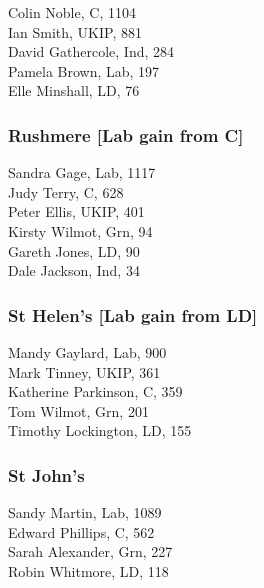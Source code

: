 \documentclass[a4paper,openany,10pt]{book}
\begin{document}


Colin Noble, C, 1104\\
Ian Smith, UKIP, 881\\
David Gathercole, Ind, 284\\
Pamela Brown, Lab, 197\\
Elle Minshall, LD, 76\\


\subsubsection*{Rushmere \hspace*{\fill}\nolinebreak[1]%
\enspace\hspace*{\fill}
[Lab gain from C]}



Sandra Gage, Lab, 1117\\
Judy Terry, C, 628\\
Peter Ellis, UKIP, 401\\
Kirsty Wilmot, Grn, 94\\
Gareth Jones, LD, 90\\
Dale Jackson, Ind, 34\\


\subsubsection*{St Helen's \hspace*{\fill}\nolinebreak[1]%
\enspace\hspace*{\fill}
[Lab gain from LD]}



Mandy Gaylard, Lab, 900\\
Mark Tinney, UKIP, 361\\
Katherine Parkinson, C, 359\\
Tom Wilmot, Grn, 201\\
Timothy Lockington, LD, 155\\


\subsubsection*{St John's}



Sandy Martin, Lab, 1089\\
Edward Phillips, C, 562\\
Sarah Alexander, Grn, 227\\
Robin Whitmore, LD, 118\\
\end{document}

